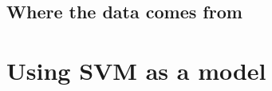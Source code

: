 \documentclass[11pt]{article} %
\begin{document}
\subsection{Where the data comes from}
\label{sec:data_origins}
% 
% 
% 
% 
% 
% 

\section{Using SVM as a model}
\label{sec:results}
 
% 
% 
\end{document}
